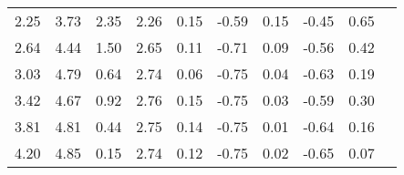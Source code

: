 \begin{tabular}{rrrrrrrrrr}
 2.25 &     3.73 &     2.35  &     2.26 &      0.15 &     -0.59 &      0.15 &     -0.45 &      0.65 \\ 
 2.64 &     4.44 &     1.50  &     2.65 &      0.11 &     -0.71 &      0.09 &     -0.56 &      0.42 \\ 
 3.03 &     4.79 &     0.64  &     2.74 &      0.06 &     -0.75 &      0.04 &     -0.63 &      0.19 \\ 
 3.42 &     4.67 &     0.92  &     2.76 &      0.15 &     -0.75 &      0.03 &     -0.59 &      0.30 \\ 
 3.81 &     4.81 &     0.44  &     2.75 &      0.14 &     -0.75 &      0.01 &     -0.64 &      0.16 \\ 
 4.20 &     4.85 &     0.15  &     2.74 &      0.12 &     -0.75 &      0.02 &     -0.65 &      0.07 \\ \hline 
\end{tabular}
